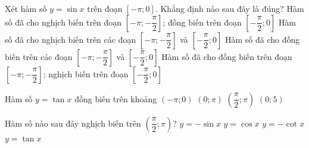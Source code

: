 

\begin{ex}%
	Xét hàm số $y=\sin x$ trên đoạn  $\left[-\pi;0 \right]$. Khẳng định nào sau đây là đúng?
	\choice 
		{\True Hàm số đã cho nghịch biến trên đoạn $\left[-\pi;-\dfrac{\pi }{2} \right]$;  đồng biến trên đoạn $\left[-\dfrac{\pi }{2};0 \right]$}
		{Hàm số đã cho nghịch biến trên các đoạn $\left[-\pi;-\dfrac{\pi }{2}  \right]$ và $\left[-\dfrac{\pi }{2};0 \right]$}
		 {Hàm số đã cho đồng biến trên các đoạn $\left[-\pi;-\dfrac{\pi }{2} \right]$ và $\left[-\dfrac{\pi }{2};0 \right]$}
		{Hàm số đã cho đồng biến  trên đoạn $\left[-\pi;-\dfrac{\pi }{2} \right]$; nghịch biến trên đoạn $\left[-\dfrac{\pi }{2};0 \right]$}
\end{ex}

\begin{ex}%
	 Hàm số $y=\tan x$ đồng biến trên khoảng
	 \choice
		 {$\left(-\pi;0\right)$}
		{$\left(0;\pi \right)$} 
		 {\True $\left(\dfrac{\pi}{2};\pi \right)$}
		 {$\left(0;5\right)$}
\end{ex}

\begin{ex}%
	Hàm số  nào sau đây nghịch biến trên $\left( \dfrac{\pi }{2};\pi \right)$?
	\choice 
		{$y=-\sin x$} 
		{\True  $y=\cos x$}
		{$y=-\cot  x$}
		{$y=\tan x$} 
\end{ex}

